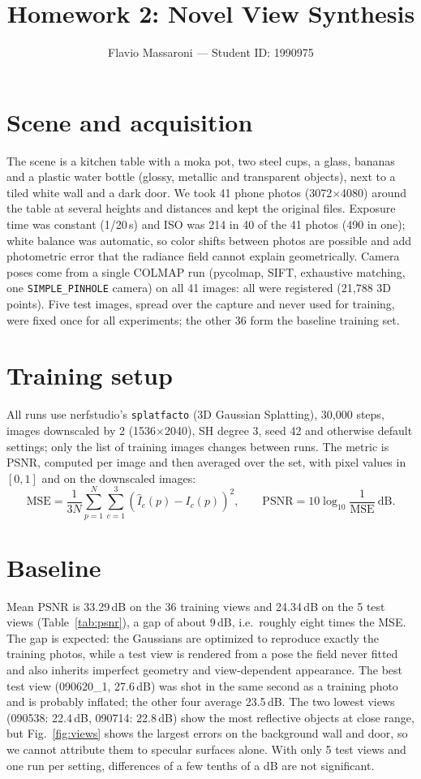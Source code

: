\documentclass[11pt]{article}
\title{Homework 2: Novel View Synthesis}
\author{Flavio Massaroni --- Student ID: 1990975}
\date{}
\begin{document}
\maketitle

\section{Scene and acquisition}
The scene is a kitchen table with a moka pot, two steel cups, a glass, bananas and a plastic
water bottle (glossy, metallic and transparent objects), next to a tiled white wall and a dark
door. We took 41 phone photos (3072$\times$4080) around the table at several heights and
distances and kept the original files.
Exposure time was constant (1/20\,s) and ISO was 214 in 40 of the 41 photos (490 in one);
white balance was automatic, so color shifts between photos are possible and add
photometric error that the radiance field cannot explain geometrically.
Camera poses come from a single COLMAP run (pycolmap, SIFT, exhaustive matching, one
\texttt{SIMPLE\_PINHOLE} camera) on all 41 images: all were registered (21,788 3D points).
Five test images, spread over the capture and never used for training, were fixed once for all
experiments; the other 36 form the baseline training set.

\section{Training setup}
All runs use nerfstudio's \texttt{splatfacto} (3D Gaussian Splatting), 30,000 steps, images
downscaled by 2 (1536$\times$2040), SH degree 3, seed 42 and otherwise default settings; only
the list of training images changes between runs. The metric is PSNR, computed per image and
then averaged over the set, with pixel values in $[0,1]$ and on the downscaled images:
\begin{equation*}
\mathrm{MSE} = \frac{1}{3N}\sum_{p=1}^{N}\sum_{c=1}^{3}\left(\hat{I}_c(p) - I_c(p)\right)^2,
\qquad
\mathrm{PSNR} = 10\log_{10}\frac{1}{\mathrm{MSE}}\ \mathrm{dB}.
\end{equation*}

\section{Baseline}
Mean PSNR is 33.29\,dB on the 36 training views and 24.34\,dB on the 5 test views
(Table~\ref{tab:psnr}), a gap of about 9\,dB, i.e.\ roughly eight times the MSE. The gap is
expected: the Gaussians are optimized to reproduce exactly the training photos, while a test
view is rendered from a pose the field never fitted and also inherits imperfect geometry and
view-dependent appearance. The best test view (090620\_1, 27.6\,dB) was shot in the same
second as a training photo and is probably inflated; the other four average 23.5\,dB. The two
lowest views (090538: 22.4\,dB, 090714: 22.8\,dB) show the most reflective objects at close
range, but Fig.~\ref{fig:views} shows the largest errors on the background wall and door, so
we cannot attribute them to specular surfaces alone. With only 5 test views and one run per
setting, differences of a few tenths of a dB are not significant.
\end{document}
